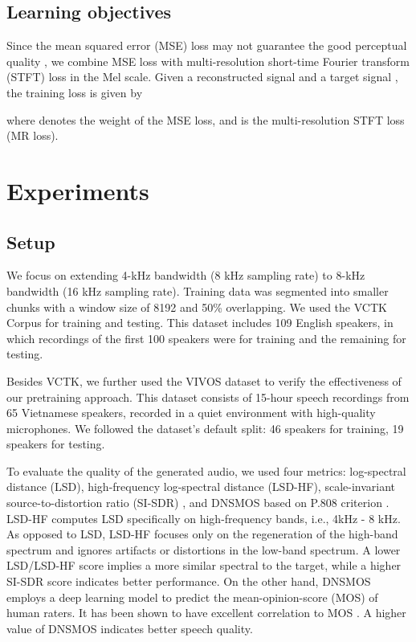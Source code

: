 \documentclass{article}
\begin{document}
\subsection{Learning objectives}
Since the mean squared error (MSE) loss may not guarantee the good perceptual quality \cite{perceptual2}, we combine MSE loss with multi-resolution short-time Fourier transform (STFT) loss \cite{mulres} in the Mel scale. Given a reconstructed signal  and a target signal , the training loss is given by \vspace{-0.3cm}


\noindent
where  denotes the weight of the MSE loss, and  is the multi-resolution STFT loss (MR loss).
\vspace{-0.4cm}


\section{Experiments}
\label{sec:experiments}
\vspace{-0.4cm}
\subsection{Setup}
\vspace{-0.1cm}
We focus on extending 4-kHz bandwidth (8 kHz sampling rate) to 8-kHz bandwidth (16 kHz sampling rate). Training data was segmented into smaller chunks with a window size of 8192 and 50\% overlapping. We used the VCTK Corpus \cite{Veaux2017CSTRVC} for training and testing. This dataset includes 109 English speakers, in which recordings of the first 100 speakers were for training and the remaining for testing.

Besides VCTK, we further used the VIVOS dataset \cite{vivos} to verify the effectiveness of our pretraining approach. This dataset consists of 15-hour speech recordings from 65 Vietnamese speakers, recorded in a quiet environment with high-quality microphones. We followed the dataset's default split: 46 speakers for training, 19 speakers for testing. 

To evaluate the quality of the generated audio, we used four metrics: log-spectral distance (LSD), high-frequency log-spectral distance (LSD-HF), scale-invariant source-to-distortion ratio (SI-SDR) \cite{LeRoux2019SDRH}, and DNSMOS based on P.808 criterion \cite{dnsmos}. LSD-HF computes LSD specifically on high-frequency bands, i.e., 4kHz - 8 kHz. As opposed to LSD, LSD-HF focuses only on the regeneration of the high-band spectrum and ignores artifacts or distortions in the low-band spectrum. A lower LSD/LSD-HF score implies a more similar spectral to the target, while a higher SI-SDR score indicates better performance. On the other hand, DNSMOS employs a deep learning model to predict the mean-opinion-score (MOS) of human raters. It has been shown to have excellent correlation to MOS \cite{dnsmos}. A higher value of DNSMOS indicates better speech quality.
\end{document}
